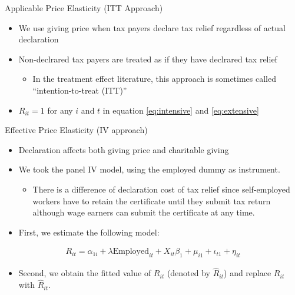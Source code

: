 \documentclass[
  ignorenonframetext,
  aspectratio=169,
]{beamer}
\providecommand{\tightlist}{%
  \setlength{\itemsep}{0pt}\setlength{\parskip}{0pt}}
\begin{document}
\begin{frame}{Applicable Price Elasticity (ITT Approach)}
\protect\hypertarget{applicable-price-elasticity-itt-approach}{}
\begin{itemize}
\tightlist
\item
  We use giving price when tax payers declare tax relief regardless of actual declaration
\item
  Non-declrared tax payers are treated as if they have declrared tax relief

  \begin{itemize}
  \tightlist
  \item
    In the treatment effect literature, this approach is sometimes called ``intention-to-treat (ITT)''
  \end{itemize}
\item
  \(R_{it} = 1\) for any \(i\) and \(t\) in equation \eqref{eq:intensive} and \eqref{eq:extensive}
\end{itemize}
\end{frame}

\begin{frame}{Effective Price Elasticity (IV approach)}
\protect\hypertarget{effective-price-elasticity-iv-approach}{}
\begin{itemize}
\tightlist
\item
  Declaration affects both giving price and charitable giving
\item
  We took the panel IV model, using the employed dummy as instrument.

  \begin{itemize}
  \tightlist
  \item
    There is a difference of declaration cost of tax relief since self-employed workers have to retain the certificate until they submit tax return although wage earners can submit the certificate at any time.
  \end{itemize}
\item
  First, we estimate the following model:
\end{itemize}

\begin{align}
  R_{it}
  = \alpha_{1i} + \lambda \text{Employed}_{it} + X_{it} \beta_1
  + \mu_{i1} + \iota_{t1} + \eta_{it} \label{eq:stage1}
\end{align}

\begin{itemize}
\tightlist
\item
  Second, we obtain the fitted value of \(R_{it}\) (denoted by \(\hat{R}_{it}\)) and replace \(R_{it}\) with \(\hat{R}_{it}\).
\end{itemize}
\end{frame}
\end{document}
